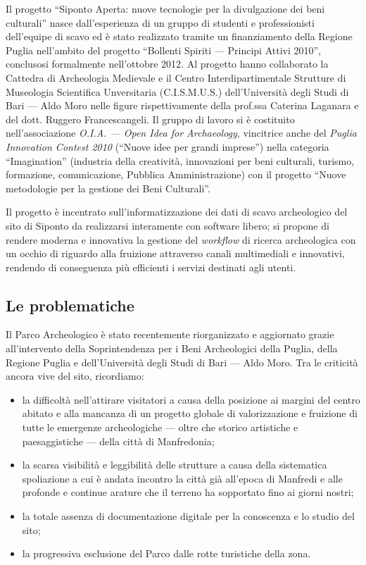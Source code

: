 \documentclass{paper}
\begin{document}
    Il progetto ``Siponto Aperta: nuove tecnologie per la divulgazione dei beni culturali'' nasce dall'esperienza di un gruppo di studenti e professionisti dell'equipe di scavo ed è stato realizzato tramite un finanziamento della Regione Puglia nell'ambito del progetto ``Bollenti Spiriti --- Principi Attivi 2010'', conclusosi formalmente nell'ottobre 2012. Al progetto hanno collaborato la Cattedra di Archeologia Medievale e il Centro Interdipartimentale Strutture di Museologia Scientifica Unversitaria (C.I.S.M.U.S.) dell'Università degli Studi di Bari --- Aldo Moro nelle figure rispettivamente della prof.ssa Caterina Laganara e del dott. Ruggero Francescangeli. Il gruppo di lavoro si è costituito nell'associazione \emph{O.I.A. --- Open Idea for Archaeology}, vincitrice anche del \textit{Puglia Innovation Contest 2010} (``Nuove idee per grandi imprese'') nella categoria ``Imagination'' (industria della creatività, innovazioni per beni culturali, turismo, formazione, comunicazione, Pubblica Amministrazione) con il progetto ``Nuove metodologie per la gestione dei Beni Culturali''.

    Il progetto è incentrato sull'informatizzazione dei dati di scavo archeologico del sito di Siponto da realizzarsi interamente con software libero; si propone di rendere moderna e innovativa la gestione del \textit{workflow} di ricerca archeologica con un occhio di riguardo alla fruizione attraverso canali multimediali e innovativi, rendendo di conseguenza più efficienti i servizi destinati agli utenti. 

    \subsection{Le problematiche}

        Il Parco Archeologico è stato recentemente riorganizzato e aggiornato grazie all'intervento della Soprintendenza per i Beni Archeologici della Puglia, della Regione Puglia e dell'Università degli Studi di Bari --- Aldo Moro. Tra le criticità ancora vive del sito, ricordiamo:

        \begin{itemize}
            \item la difficoltà nell'attirare visitatori a causa della posizione ai margini del centro abitato e alla mancanza di un progetto globale di valorizzazione e fruizione di tutte le emergenze archeologiche --- oltre che storico artistiche e paesaggistiche --- della città di Manfredonia;
            \item la scarsa visibilità e leggibilità delle strutture a causa della sistematica spoliazione a cui è andata incontro la città già all'epoca di Manfredi e alle profonde e continue arature che il terreno ha sopportato fino ai giorni nostri;
            \item la totale assenza di documentazione digitale per la conoscenza e lo studio del sito;
            \item la progressiva esclusione del Parco dalle rotte turistiche della zona.
        \end{itemize}
\end{document}
